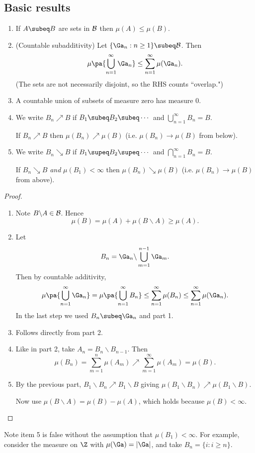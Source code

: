 \subsection{Basic results}
\begin{pr}\label{measure-basic}
\begin{enumerate}
\item If $A\subeq B$ are sets in $\cal B$ then $\mu(A)\leq \mu(B)$.
\item (Countable subadditivity) Let $\{\Ga_n:n\geq 1\}\subeq \cal B$. Then 
\[
\mu\pa{
\bigcup_{n=1}^{\infty} \Ga_n}\leq \sum_{n=1}^{\infty} \mu(\Ga_n).
\]
(The sets are not necessarily disjoint, so the RHS counts ``overlap.")

\item A countable union of subsets of measure zero has measure 0.
\item We write $B_n \nearrow B$ if $B_1\subeq B_2\subeq \cdots $ and $\bigcup_{n=1}^{\infty} B_n=B$.

If $B_n\nearrow B$ then $\mu(B_n)\nearrow \mu(B)$ (i.e. $\mu(B_n)\to \mu(B)$ from below).
\item We write $B_n \searrow B$ if $B_1\supeq B_2\supeq \cdots $ and $\bigcap_{n=1}^{\infty} B_n=B$.

If $B_n\searrow B$ \textit{and} $\mu(B_1)<\infty$ then $\mu(B_n)\searrow \mu(B)$ (i.e. $\mu(B_n)\to \mu(B)$ from above).
\end{enumerate}
\end{pr}
\begin{proof}
\begin{enumerate}
\item Note $B\backslash A\in \cal B$. Hence
\[
\mu(B)=\mu(A)+\mu(B\backslash A)\geq \mu(A).
\]
\item 
Let
\[
B_n=\Ga_n\backslash \bigcup_{m=1}^{n-1}\Ga_m.
\]
Then by countable additivity,
\[
\mu\pa{
\bigcup_{n=1}^{\infty} \Ga_n}
=
\mu\pa{
\bigcup_{n=1}^{\infty} B_n}
\leq \sum_{n=1}^{\infty} \mu(B_n)
\leq \sum_{n=1}^{\infty} \mu(\Ga_n).
\]
In the last step we used $B_n\subeq \Ga_n$ and part 1.
\item Follows directly from part 2.
\item Like in part 2, take $A_n=B_n\backslash B_{n-1}$. Then
\[
\mu(B_n)=\sum_{m=1}^n\mu(A_m)\nearrow \sum_{m=1}^{\infty} \mu(A_m)=\mu(B).
\]
\item By the previous part, $B_1\backslash B_n\nearrow B_1\backslash B$ giving $\mu(B_1\backslash B_n)\nearrow\mu(B_1\backslash B)$.

Now use %
$\mu(B\backslash A)=\mu(B)-\mu(A)$, which holds because $\mu(B)<\infty$. %

\end{enumerate}
\end{proof}
Note item 5 is false without the assumption that $\mu(B_1)<\infty$.
For example, consider the measure on $\Z$ with $\mu(\Ga)=|\Ga|$, and take $B_n=\{i:i\geq n\}$. 


